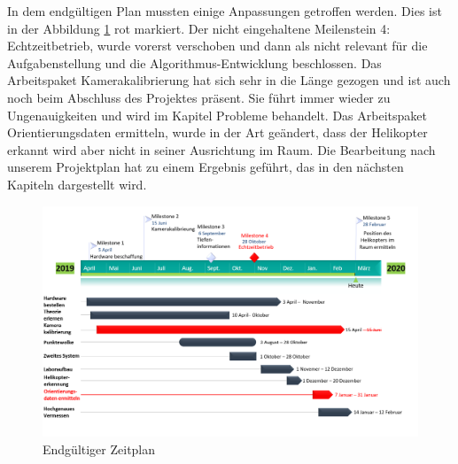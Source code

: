 \noindent In dem endgültigen Plan mussten einige Anpassungen getroffen werden. Dies ist in der Abbildung \ref{fig:ms2} rot markiert. Der nicht eingehaltene Meilenstein 4: Echtzeitbetrieb, wurde vorerst verschoben und dann als nicht relevant für die Aufgabenstellung und die Algorithmus-Entwicklung beschlossen. Das Arbeitspaket Kamerakalibrierung hat sich sehr in die Länge gezogen und ist auch noch beim Abschluss des Projektes präsent. Sie führt immer wieder zu Ungenauigkeiten und wird im Kapitel Probleme behandelt. Das Arbeitspaket Orientierungsdaten ermitteln, wurde in der Art geändert, dass der Helikopter erkannt wird aber nicht in seiner Ausrichtung im Raum. Die Bearbeitung nach unserem Projektplan hat zu einem Ergebnis geführt, das in den nächsten Kapiteln dargestellt wird. 

\begin{figure}[H]
	\includegraphics[scale=0.36]{bilder/ms2}
	\caption[Endgültiger Zeitplan ]{Endgültiger Zeitplan }
	\label{fig:ms2}
\end{figure}